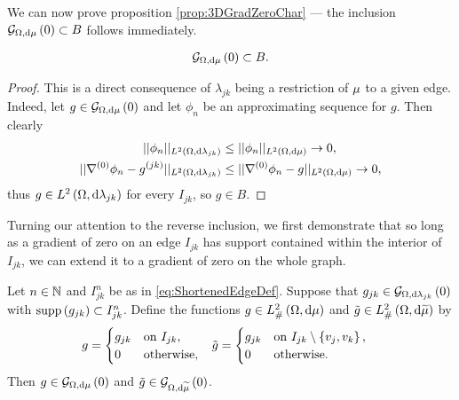We can now prove proposition \ref{prop:3DGradZeroChar} --- the inclusion $\mathcal{G}_{ \Omega, \mathrm{d}\mu}\left( 0 \right)\subset B$ follows immediately.
\begin{lemma} \label{lem:3DGradZeroSubsetB}
	\begin{align*}
		\mathcal{G}_{ \Omega, \mathrm{d}\mu}\left( 0 \right) \subset B.
	\end{align*}
\end{lemma}
\begin{proof}
	This is a direct consequence of $\lambda_{jk}$ being a restriction of $\mu$ to a given edge.
	Indeed, let $g\in\mathcal{G}_{ \Omega, \mathrm{d}\mu}\left( 0 \right)$ and let $\phi_n$ be an approximating sequence for $g$.
	Then clearly
	\begin{align*}
		\lvert\lvert \phi_n \rvert\rvert_{L^{2}\left( \Omega,\mathrm{d} \lambda_{jk} \right)} &\leq \lvert\lvert \phi_n \rvert\rvert_{L^{2}\left( \Omega,\mathrm{d} \mu \right)} \rightarrow 0, \\
		\lvert\lvert \nabla^{(0)}\phi_n - g^{(jk)} \rvert\rvert_{L^{2}\left( \Omega,\mathrm{d} \lambda_{jk} \right)} &\leq \lvert\lvert \nabla^{(0)}\phi_n - g \rvert\rvert_{L^{2}\left( \Omega,\mathrm{d} \mu \right)} \rightarrow 0,
	\end{align*}
	thus $g\in L^{2}\left( \Omega,\mathrm{d} \lambda_{jk} \right)$ for every $I_{jk}$, so $g\in B$.
\end{proof}
Turning our attention to the reverse inclusion, we first demonstrate that so long as a gradient of zero on an edge $I_{jk}$ has support contained within the interior of $I_{jk}$, we can extend it to a gradient of zero on the whole graph.
\begin{lemma} \label{lem:3DExtensionLemmaGrads}
	Let $n\in\mathbb{N}$ and $I_{jk}^n$ be as in \eqref{eq:ShortenedEdgeDef}.
	Suppose that $g_{jk}\in\mathcal{G}_{ \Omega, \mathrm{d}\lambda_{jk}}\left( 0 \right)$ with $\mathrm{supp}\left( g_{jk} \right)\subset I_{jk}^n$.
	Define the functions $g\in L^2_{\#}\left( \Omega,\mathrm{d} \mu \right)$ and $\tilde{g}\in L^2_{\#}\left( \Omega,\mathrm{d} \widetilde{\mu} \right)$ by
	\begin{align*}
		g =	\begin{cases} g_{jk} & \mathrm{on} \ I_{jk}, \\ 0 & \mathrm{otherwise}, \end{cases} 
		&\quad
		\tilde{g} =	\begin{cases} g_{jk} & \mathrm{on} \ I_{jk}\setminus\clbracs{v_j,v_k}, \\ 0 & \mathrm{otherwise}. \end{cases}
	\end{align*}
	Then $g\in\mathcal{G}_{ \Omega, \mathrm{d}\mu}\left( 0 \right)$ and $\tilde{g}\in\mathcal{G}_{ \Omega, \mathrm{d}\widetilde{\mu}}\left( 0 \right)$.
\end{lemma}
